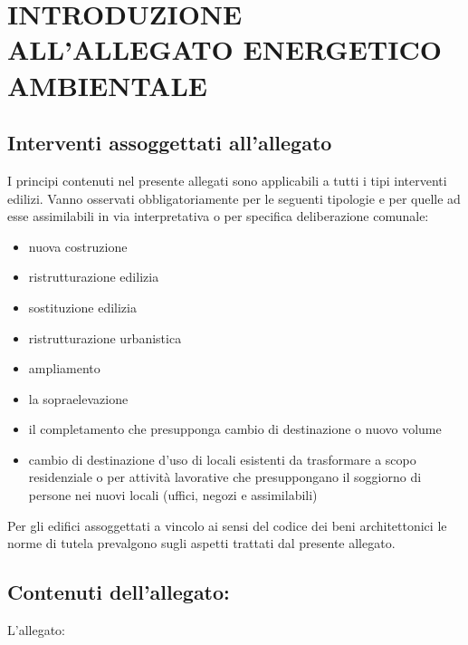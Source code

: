 
\chapter[Introduzione]{INTRODUZIONE ALL'ALLEGATO ENERGETICO AMBIENTALE}
\label{chp:allegato-en-amb}

\section{Interventi assoggettati all'allegato}
\label{sec:interventi-assogg}


I principi contenuti nel presente allegati sono applicabili a tutti i tipi interventi edilizi. Vanno osservati obbligatoriamente per le seguenti tipologie e per quelle ad esse assimilabili in via interpretativa o per specifica deliberazione comunale:

\begin{itemize}
\item nuova costruzione
\item ristrutturazione edilizia
\item sostituzione edilizia
\item ristrutturazione urbanistica
\item ampliamento
\item la sopraelevazione
\item il completamento che presupponga cambio di destinazione o nuovo volume
\item cambio di destinazione d'uso di locali esistenti da trasformare a scopo residenziale o per attività lavorative che presuppongano il soggiorno di persone nei nuovi locali (uffici, negozi e assimilabili)
\end{itemize}

Per gli edifici assoggettati a vincolo ai sensi del codice dei beni architettonici le norme di tutela prevalgono sugli aspetti trattati dal presente allegato.

\section{Contenuti dell'allegato:}
\label{contenutidellallegato:}

L'allegato:

